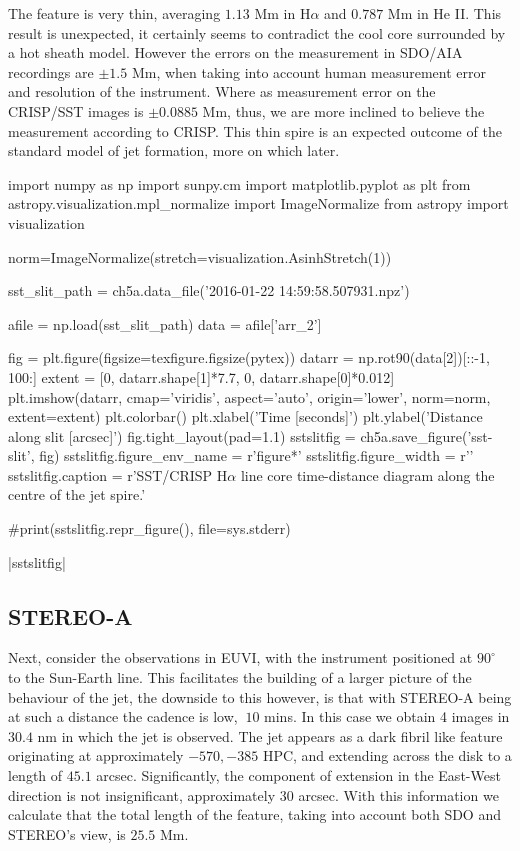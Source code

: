 The feature is very thin, averaging $1.13$ Mm in H$\alpha$ and $0.787$ Mm in He II. 
This result is unexpected, it certainly seems to contradict the cool core surrounded by a hot sheath model.
However the errors on the measurement in SDO/AIA recordings are $\pm1.5$ Mm, when taking into account human measurement error and resolution of the instrument.
Where as measurement error on the CRISP/SST images is $\pm0.0885$ Mm, thus, we are more inclined to believe the measurement according to CRISP.
This thin spire is an expected outcome of the standard model of jet formation, more on which later.




\begin{pycode}[chapter5a]
import numpy as np
import sunpy.cm
import matplotlib.pyplot as plt
from astropy.visualization.mpl_normalize import ImageNormalize 
from astropy import visualization

norm=ImageNormalize(stretch=visualization.AsinhStretch(1))

sst_slit_path = ch5a.data_file('2016-01-22 14:59:58.507931.npz')

afile = np.load(sst_slit_path)
data = afile['arr_2']

fig = plt.figure(figsize=texfigure.figsize(pytex))
datarr = np.rot90(data[2])[::-1, 100:]
extent = [0, datarr.shape[1]*7.7, 0, datarr.shape[0]*0.012]
plt.imshow(datarr, cmap='viridis', aspect='auto', origin='lower', norm=norm, extent=extent)
plt.colorbar()
plt.xlabel('Time [seconds]')
plt.ylabel('Distance along slit [arcsec]')
fig.tight_layout(pad=1.1)
sstslitfig = ch5a.save_figure('sst-slit', fig)
sstslitfig.figure_env_name = r'figure*'
sstslitfig.figure_width = r'\columnwidth'
sstslitfig.caption = r'SST/CRISP H$\alpha$ line core time-distance diagram along the centre of the jet spire.'

#print(sstslitfig.repr_figure(), file=sys.stderr)
\end{pycode}

\py[chapter5a]|sstslitfig|



\subsection{STEREO-A}
Next, consider the observations in EUVI, with the instrument positioned at $90^{\circ}$ to the Sun-Earth line.
This facilitates the building of a larger picture of the behaviour of the jet, the downside to this however, is that with STEREO-A being at such a distance the cadence is low, $~10$ mins.
In this case we obtain 4 images in $30.4$ nm in which the jet is observed.
The jet appears as a dark fibril like feature originating at approximately $-570, -385$ HPC, and extending across the disk to a length of $45.1$ arcsec.
Significantly, the component of extension in the East-West direction is not insignificant, approximately $30$ arcsec.
With this information we calculate that the total length of the feature, taking into account both SDO and STEREO's view, is $25.5$ Mm.



